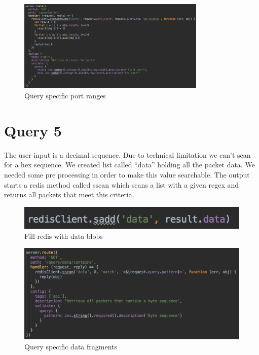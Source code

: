 \begin{figure}[H]
	\centerline{\includegraphics[width=0.8\textwidth]{resources/solution2-9.png}}
	\caption{Query specific port ranges}
	\label{query44}
\end{figure}

\section{Query 5}
The user input is a decimal sequence. Due to technical limitation we can’t scan for a hex sequence. We created list called “data” holding all the packet data. We needed some pre processing in order to make this value searchable. The output starts a redis method called sscan which scans a list with a given regex and returns all packets that meet this criteria.

  \begin{figure}[H]
	\centerline{\includegraphics[width=1.0\textwidth]{resources/solution2-10.png}}
	\caption{Fill redis with data blobs}
	\label{query5}
\end{figure}

\begin{figure}[H]
	\centerline{\includegraphics[width=1.0\textwidth]{resources/solution2-11.png}}
	\caption{Query specific data fragments}
	\label{query55}
\end{figure}

